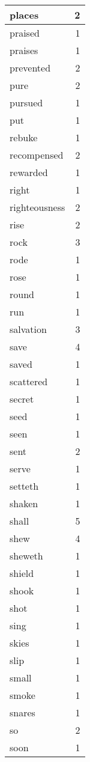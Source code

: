 \begin{center}
\begin{longtable}{l|r}
places & 2 \\ \hline
praised & 1 \\ \hline
praises & 1 \\ \hline
prevented & 2 \\ \hline
pure & 2 \\ \hline
pursued & 1 \\ \hline
put & 1 \\ \hline
rebuke & 1 \\ \hline
recompensed & 2 \\ \hline
rewarded & 1 \\ \hline
right & 1 \\ \hline
righteousness & 2 \\ \hline
rise & 2 \\ \hline
rock & 3 \\ \hline
rode & 1 \\ \hline
rose & 1 \\ \hline
round & 1 \\ \hline
run & 1 \\ \hline
salvation & 3 \\ \hline
save & 4 \\ \hline
saved & 1 \\ \hline
scattered & 1 \\ \hline
secret & 1 \\ \hline
seed & 1 \\ \hline
seen & 1 \\ \hline
sent & 2 \\ \hline
serve & 1 \\ \hline
setteth & 1 \\ \hline
shaken & 1 \\ \hline
shall & 5 \\ \hline
shew & 4 \\ \hline
sheweth & 1 \\ \hline
shield & 1 \\ \hline
shook & 1 \\ \hline
shot & 1 \\ \hline
sing & 1 \\ \hline
skies & 1 \\ \hline
slip & 1 \\ \hline
small & 1 \\ \hline
smoke & 1 \\ \hline
snares & 1 \\ \hline
so & 2 \\ \hline
soon & 1 \\ \hline

\end{longtable}
\end{center}
